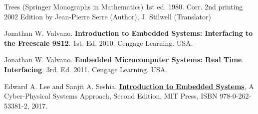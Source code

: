 \documentclass[10pt]{amsart}
\begin{document}
\begin{thebibliography}{9}

Trees (Springer Monographs in Mathematics) 1st ed. 1980. Corr. 2nd printing 2002 Edition
by Jean-Pierre Serre (Author), J. Stilwell (Translator) 

Jonathan W. Valvano.  \textbf{Introduction to Embedded Systems: Interfacing to the Freescale 9S12}.  1st. Ed. 2010.  Cengage Learning.  USA.  

Jonathan W. Valvano.  \textbf{Embedded Microcomputer Systems: Real Time Interfacing}.  3rd. Ed. 2011.  Cengage Learning.  USA.  

Edward A. Lee and Sanjit A. Seshia, \textbf{\href{http://leeseshia.org/index.html}{Introduction to Embedded Systems}}, A Cyber-Physical Systems Approach, Second Edition, MIT Press, ISBN 978-0-262-53381-2, 2017. 

\end{thebibliography}
\end{document}
